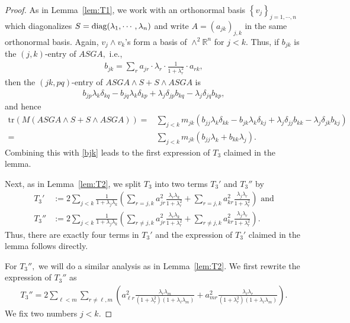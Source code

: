 \documentclass[11pt]{amsart}
\numberwithin{equation}{section}
\theoremstyle{definition}
\theoremstyle{definition}
\newcommand{\set}[1]{\left\{#1\right\}}
\newcommand{\pr}[1]{\left(#1\right)}
\newcommand{\bb}[1]{\mathbb{#1}} \newcommand{\td}[1]{\widetilde{#1}}
\newcommand{\tr}{\text{tr}}
\begin{document}
\begin{proof}
	As in Lemma~\ref{lem:T1}, we work with an orthonormal basis $\set{v_j}_{j=1,\cdots,n}$ which diagonalizes $S={\rm diag}(\lambda_1,\cdots,\lambda_n)$ and write $A=(a_{jk})_{j,k}$ in the same orthonormal basis.
	Again, $v_j\wedge v_k$'s form a basis of $\wedge^2\bb R^n$ for $j<k.$
	Thus, if $b_{jk}$ is the $(j,k)$-entry of $ASGA,$ i.e.,
	\begin{align}\label{bjk}
	b_{jk}
	= \sum_{r} a_{jr}\cdot \lambda_r\cdot \frac 1{1+\lambda_r^2}\cdot a_{rk},
	\end{align}
	then the $(jk,pq)$-entry of $ASGA \wedge S + S \wedge ASGA$ is
	\begin{align*}
	b_{jp}\lambda_k\delta_{kq} - b_{jq}\lambda_k\delta_{kp}
	+ \lambda_j\delta_{jp}b_{kq}
	- \lambda_j\delta_{jq}b_{kp},
	\end{align*}
	and hence
	\begin{align*}
	\tr\pr{M (ASGA \wedge S + S \wedge ASGA) }
	= & \sum_{j<k}
	m_{jk} 
	\pr{b_{jj}\lambda_k\delta_{kk} - b_{jk}\lambda_k\delta_{kj}
		+ \lambda_j\delta_{jj}b_{kk}
		- \lambda_j\delta_{jk}b_{kj}}\\
	= & \sum_{j<k} m_{jk} 
	\pr{b_{jj}\lambda_k + b_{kk}\lambda_j }.
	\end{align*}
	Combining this with \eqref{bjk} leads to the first expression of $T_3$ claimed in the lemma.
	
	Next, as in Lemma~\ref{lem:T2}, we split $T_3$ into two terms $T_3'$ and $T_3''$ by
	\begin{align*}
	T_3'
	&:=2 \sum_{j<k}
	\frac 1{1+\lambda_j\lambda_k}
	\pr{\sum_{r=j,k} a_{jr}^2
		\frac{\lambda_r \lambda_k} {1+\lambda_r^2} 
		+ \sum_{r=j,k} a_{kr}^2
		\frac{\lambda_j\lambda_r}
		{1+\lambda_r^2}
	}
	\text{ and}\\
	T_3''
	&:=2 \sum_{j<k}
	\frac 1{1+\lambda_j\lambda_k}
	\pr{\sum_{r\neq j,k} a_{jr}^2
		\frac{\lambda_r \lambda_k} {1+\lambda_r^2} 
		+ \sum_{r\neq j,k}  a_{kr}^2
		\frac{\lambda_j\lambda_r}
		{1+\lambda_r^2}
	}.
	\end{align*}
	Thus, there are exactly four terms in $T_3'$ and the expression of $T_3'$ claimed in the lemma follows directly.
	
	For $T_3'',$ we will do a similar analysis as in Lemma~\ref{lem:T2}.
	We first rewrite the expression of $T_3''$ as 
	\begin{align*}
	T_3''
	= 2 \sum_{\ell<m}
	\sum_{r\neq \ell,m}
	\pr{
		a_{\ell r}^2
		\frac{\lambda_r \lambda_m}{(1+\lambda_r^2)(1+\lambda_\ell\lambda_m)}
		+ a_{mr}^2
		\frac{\lambda_\ell\lambda_r}
		{(1+\lambda_r^2)(1+\lambda_\ell\lambda_m)}
	}.
	\end{align*}
	We fix two numbers $j<k.$
	

\end{proof}
\end{document}
